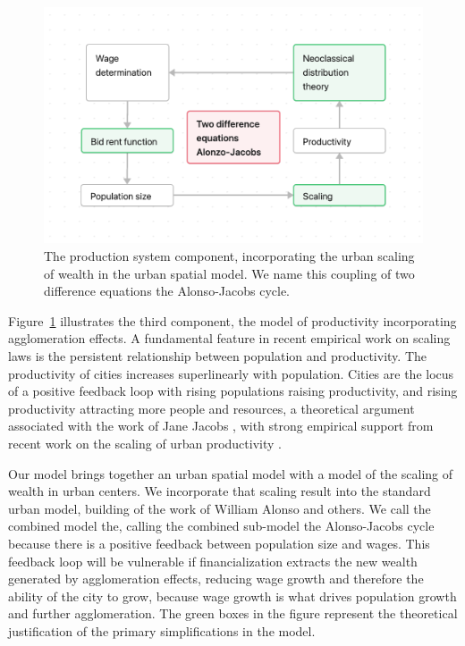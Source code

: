 \begin{figure}[!ht]
\centering
\includegraphics[scale=.7]{fig/flow-alonso-jacobs-cycle.png}
\caption[Production system.]{The production system component, incorporating the urban scaling of wealth in the urban spatial model. We name this coupling of two difference equations the Alonso-Jacobs cycle.}
\label{fig-alonso-jacobs-cycle}
\end{figure}

Figure~\ref{fig-alonso-jacobs-cycle} illustrates the third component, the model of productivity incorporating agglomeration effects. A fundamental feature in recent empirical work on scaling laws is the persistent relationship between population and productivity. The productivity of cities increases superlinearly with population. Cities are the locus of a positive feedback loop with rising populations raising productivity, and rising productivity attracting more people and resources, a theoretical argument associated with the work of Jane Jacobs \cite{jacobsEconomyCities1969}, with strong empirical support from recent work on the scaling of urban productivity  \cite{bettencourtGrowthInnovationScaling2007, bettencourtOriginsScalingCities2013, dongUnderstandingMesoscopicScaling2020, loboUrbanScalingProduction2013}.

Our model brings together an urban spatial model with a model of the scaling of wealth in urban centers. We incorporate that scaling result into the standard urban model, building of the work of William Alonso and others. We call the combined model the\cite{alonsoTheoryUrbanLand1960}, calling the combined sub-model the \gls{Alonso-Jacobs cycle} because there is a positive feedback between population size and wages. This feedback loop will be vulnerable if financialization extracts the new wealth generated by agglomeration effects, reducing wage growth and therefore the ability of the city to grow, because wage growth is what drives population growth and further agglomeration. The green boxes in the figure represent the theoretical justification of the primary simplifications in the model. 

